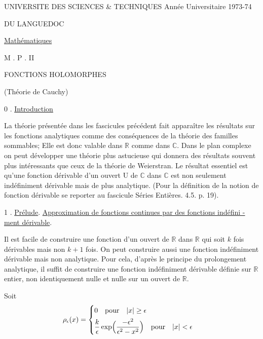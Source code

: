 UNIVERSITE DES SCIENCES \& TECHNIQUES \hfill Année Universitaire 1973-74

DU LANGUEDOC

\uline{Mathématiques}

M . P . II

FONCTIONS HOLOMORPHES

(Théorie de Cauchy)

0 . \uline{Introduction}

La théorie présentée dans les fascicules précédent fait apparaître
les résultats sur les fonctions analytiques comme des conséquences de la théorie
des familles sommables; Elle est donc valable dans $\mathbb{R}$ comme dans $\mathbb{C}$. Dans le
plan complexe on peut développer une théorie plus astucieuse qui donnera des
résultats souvent plus intéressants que ceux de la théorie de Weierstran. Le
résultat essentiel est qu'une fonction dérivable d'un ouvert U de $\mathbb{C}$ dans $\mathbb{C}$
est non seulement indéfiniment dérivable mais de plus analytique. (Pour la
définition de la notion de fonction dérivable se reporter au fascicule
Séries Entières. 4.5. p. 19).

1 . \uline{Prélude}. \uline{Approximation de fonctions continues par des fonctions indéfini -}
\uline{ment dérivable}.

Il est facile de construire une fonction d'un ouvert de $\mathbb{R}$ dans $\mathbb{R}$
qui soit $k$ fois dérivables mais non $k+1$ fois. On peut construire aussi une
fonction indéfiniment dérivable mais non analytique. Pour cela, d'après le
principe du prolongement analytique, il suffit de construire une fonction
indéfiniment dérivable définie sur $\mathbb{R}$ entier, non identiquement nulle et
nulle sur un ouvert de $\mathbb{R}$.

Soit
\[
\rho_{\epsilon}(x) = \begin{cases} 0 \quad \text{pour} \quad |x| \geq \epsilon \\[4pt] \dfrac{k}{\epsilon}\exp\Bigl(\dfrac{-\epsilon^{2}}{\epsilon^{2}-x^{2}}\Bigr) \quad \text{pour} \quad |x| < \epsilon \end{cases}
\]

